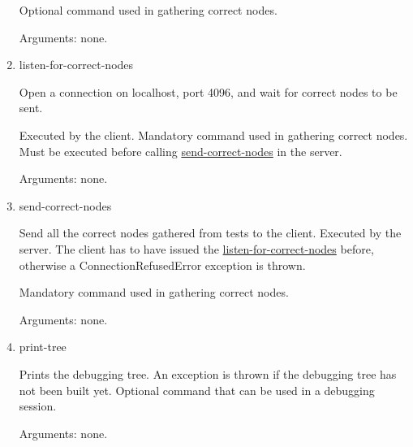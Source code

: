 \begin{enumerate}
Optional command used in gathering correct nodes.

Arguments: none.
\item listen-for-correct-nodes
\label{command:listen-for-correct-nodes}

Open a connection on localhost, port 4096, and wait for correct nodes to be sent.

Executed by the client.
Mandatory command used in gathering correct nodes.
Must be executed before calling \hyperref[command:send-correct-nodes]{send-correct-nodes} in the server.

Arguments: none.
\item send-correct-nodes
\label{command:send-correct-nodes}

Send all the correct nodes gathered from tests to the client.
Executed by the server.
The client has to have issued the \hyperref[command:listen-for-correct-nodes]{listen-for-correct-nodes} before, otherwise a ConnectionRefusedError exception is thrown.

Mandatory command used in gathering correct nodes.

Arguments: none.
\item print-tree
\label{command:print-tree}

Prints the debugging tree.
An exception is thrown if the debugging tree has not been built yet.
Optional command that can be used in a debugging session.

Arguments: none.
\end{enumerate}
